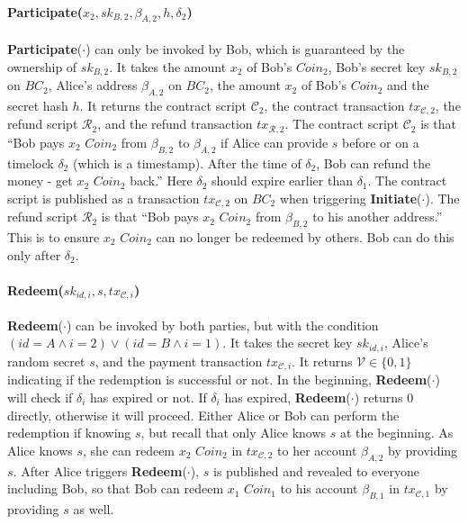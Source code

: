 \paragraph{\textbf{Participate}($x_2, sk_{B, 2}, \beta_{A, 2}, h, \delta_2$)}
\textbf{Participate}($\cdot$) can only be invoked by Bob, which is guaranteed by the ownership of $sk_{B, 2}$.
It takes the amount $x_2$ of Bob's $Coin_2$,
Bob's secret key $sk_{B, 2}$ on $BC_2$,
Alice's address $\beta_{A, 2}$ on $BC_2$,
the amount $x_2$ of Bob's $Coin_2$
and the secret hash $h$.
It returns the contract script $\mathcal{C}_2$,
the contract transaction $tx_{\mathcal{C}, 2}$,
the refund script $\mathcal{R}_2$,
and the refund transaction $tx_{\mathcal{R}, 2}$.
The contract script $\mathcal{C}_2$ is that ``Bob pays $x_2$ $Coin_2$ from $\beta_{B, 2}$ to $\beta_{A, 2}$ if Alice can provide $s$ before or on a timelock $\delta_2$ (which is a timestamp). After the time of $\delta_2$, Bob can refund the money - get $x_2$ $Coin_2$ back.''
Here $\delta_2$ should expire earlier than $\delta_1$.
The contract script is published as a transaction $tx_{\mathcal{C}, 2}$ on $BC_2$ when triggering \textbf{Initiate}($\cdot$).
The refund script $\mathcal{R}_2$ is that ``Bob pays $x_2$ $Coin_2$ from $\beta_{B, 2}$ to his another address.'' This is to ensure $x_2$ $Coin_2$ can no longer be redeemed by others. Bob can do this only after $\delta_2$.

\paragraph{\textbf{Redeem}($sk_{id, i}, s, tx_{\mathcal{C}, i}$)}
\textbf{Redeem}($\cdot$) can be invoked by both parties, but with the condition $(id = A \wedge i = 2) \vee (id = B \wedge i = 1)$.
It takes the secret key $sk_{id, i}$,
Alice's random secret $s$,
and the payment transaction $tx_{\mathcal{C}, i}$.
It returns $\mathcal{V} \in \{0, 1\}$ indicating if the redemption is successful or not.
In the beginning, \textbf{Redeem}($\cdot$) will check if $\delta_i$ has expired or not. If $\delta_i$ has expired, \textbf{Redeem}($\cdot$) returns $0$ directly, otherwise it will proceed.
Either Alice or Bob can perform the redemption if knowing $s$, but recall that only Alice knows $s$ at the beginning.
As Alice knows $s$, she can redeem $x_2$ $Coin_2$ in $tx_{\mathcal{C}, 2}$ to her account $\beta_{A, 2}$ by providing $s$.
After Alice triggers \textbf{Redeem}($\cdot$), $s$ is published and revealed to everyone including Bob, so that Bob can redeem $x_1$ $Coin_1$ to his account $\beta_{B, 1}$ in $tx_{\mathcal{C}, 1}$ by providing $s$ as well.


